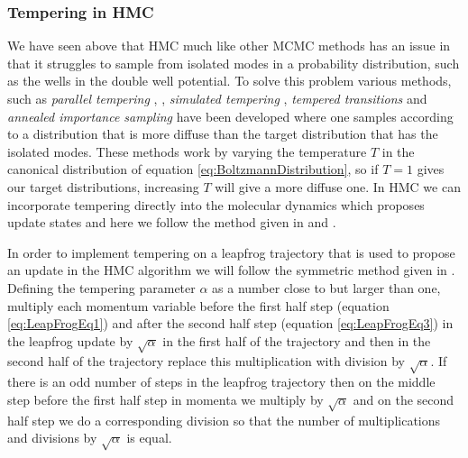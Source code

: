 \documentclass[12pt]{article}
\begin{document}
        \subsubsection{Tempering in HMC}
        We have seen above that HMC much like other MCMC methods \cite{neal_2011} has an issue in that it struggles to sample from isolated modes in a probability distribution, such as the wells in the double well potential. To solve this problem various methods, such as \textit{parallel tempering} \cite{geyer_1991}, \cite{earl_deem_2005}, \textit{simulated tempering} \cite{marinari_parisi_1992}, \textit{tempered transitions} \cite{neal_1996_b} and \textit{annealed importance sampling} \cite{neal_2001} have been developed where one samples according to a distribution that is more diffuse than the target distribution that has the isolated modes. These methods work by varying the temperature $T$ in the canonical distribution of equation \ref{eq:BoltzmannDistribution}, so if $T=1$ gives our target distributions, increasing $T$ will give a more diffuse one. In HMC we can incorporate tempering directly into the molecular dynamics which proposes update states and here we follow the method given in \cite{neal_2011} and \cite{neal_1996_b}.  

        In order to implement tempering on a leapfrog trajectory that is used to propose an update in the HMC algorithm we will follow the symmetric method given in \cite{neal_2011}. Defining the tempering parameter $\alpha$ as a number close to but larger than one, multiply each momentum variable before the first half step (equation \ref{eq:LeapFrogEq1}) and after the second half step (equation \ref{eq:LeapFrogEq3}) in the leapfrog update by $\sqrt{\alpha}$ in the first half of the trajectory and then in the second half of the trajectory replace this multiplication with division by $\sqrt{\alpha}$. If there is an odd number of steps in the leapfrog trajectory then on the middle step before the first half step in momenta we multiply by $\sqrt{\alpha}$  and on the second half step we do a corresponding division so that the number of multiplications and divisions by $\sqrt{\alpha}$ is equal.
\end{document}
